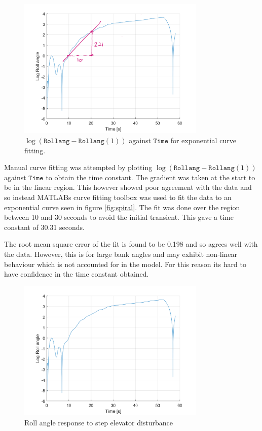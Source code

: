 \documentclass{article}
\begin{document}
\begin{figure}[H]
  \centering
  \includegraphics[width=0.8\textwidth]{figures/anSpiral_log.png}
  \caption{$\log(\texttt{Rollang} - \texttt{Rollang}(1))$ against $\texttt{Time}$ for exponential curve fitting.}
  \label{fig:spiral_log}
\end{figure}

Manual curve fitting was attempted by plotting $\log(\texttt{Rollang} - \texttt{Rollang}(1))$ against $\texttt{Time}$ to obtain the time constant.
The gradient was taken at the start to be in the linear region.
This however showed poor agreement with the data and so instead MATLABs curve fitting toolbox was used to fit the data to an exponential curve seen in figure \ref{fig:spiral}.
The fit was done over the region between 10 and 30 seconds to avoid the initial transient.
This gave a time constant of 30.31 seconds.

The root mean square error of the fit is found to be 0.198 and so agrees well with the data.
However, this is for large bank angles and may exhibit non-linear behaviour which is not accounted for in the model.
For this reason its hard to have confidence in the time constant obtained.

\begin{figure}[H]
  \centering
  \includegraphics[width=0.8\textwidth]{figures/RollSubs.png}
  \caption{Roll angle response to step elevator disturbance}
  \label{fig:rollsubs}
\end{figure}
\end{document}
